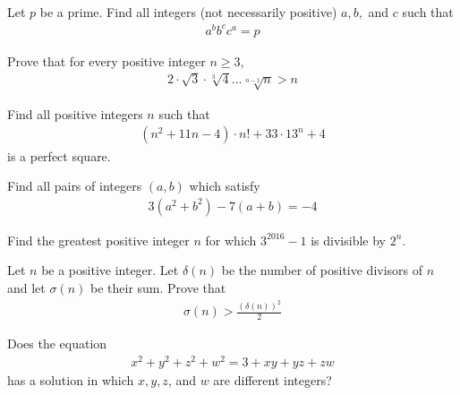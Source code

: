 \documentclass[problems.tex]{subfile}
\begin{document}
	\begin{problem}
		Let $p$ be a prime. Find all integers (not necessarily positive) $a,b,$ and $c$ such that
		\begin{align*}
			a^bb^cc^a = p
		\end{align*}
	\end{problem}

	\begin{problem}
		Prove that for every positive integer $n \geq 3$,
		\begin{align*}
			2 \cdot \sqrt 3 \cdot \sqrt[3]{4} \dots \sqrt[n-1]{n} >n
		\end{align*}
	\end{problem}

	\begin{problem}
		Find all positive integers $n$ such that
		\begin{align*}
			\left(n^2+11n-4\right)\cdot n! + 33 \cdot 13^n + 4
		\end{align*}
		is a perfect square.
	\end{problem}

	\begin{problem}
		Find all pairs of integers $(a, b)$ which satisfy
		\begin{align*}
			3 (a^2 + b^2 ) - 7 (a + b) = -4
		\end{align*}
	\end{problem}

	\begin{problem}
		Find the greatest positive integer $n$ for which $3^{2016} - 1$ is divisible by $2^n$.
	\end{problem}

	\begin{problem}
		Let $n$ be a positive integer. Let $\delta(n)$ be the number of positive divisors of $n$ and let $\sigma(n)$ be their sum. Prove that
		\begin{align*}
			\sigma(n) > \frac{\left(\delta(n)\right)^2}{2}
		\end{align*}
	\end{problem}

	\begin{problem}
		Does the equation
		\begin{align*}
			x^2+y^2+z^2+w^2=3 + xy + yz + zw
		\end{align*}
		has a solution in which $x, y, z$, and $w$ are different integers?
	\end{problem}
\end{document}
